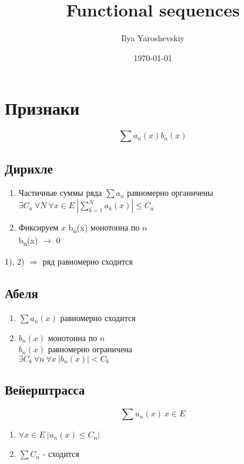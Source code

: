 \documentclass{article}
\author{Ilya Yaroshevskiy}
\date{\today}
\title{Functional sequences}
\begin{document}
\maketitle
\tableofcontents


\section{Признаки}
\label{sec:org1196bac}
\[ \sum a_n(x)b_n(x) \]
\subsection{Дирихле}
\label{sec:org4d3ddae}
\begin{enumerate}
\item Частичные суммы ряда \(\sum a_n\) равномерно органичены \\
\(\exists C_a\ \forall N\ \forall x \in E\ |\sum_{k=1}^{N}a_k(x)| \le C_a\)
\item Фиксируем \(x\) b\textsubscript{n}(x) монотонна по \(n\) \\
b\textsubscript{n}(x) \(\rightarrow\) 0
\end{enumerate}
1), 2) \(\Rightarrow\) ряд равномерно сходится

\subsection{Абеля}
\label{sec:orgad1fcd3}
\begin{enumerate}
\item \(\sum a_n(x)\) равномерно сходится
\item \(b_n(x)\) монотонна по \(n\) \\
\(b_n(x)\) равномерно ограничена \\
\(\exists C_b\ \forall n\ \forall x\ |b_n(x)| < C_b\)
\end{enumerate}
\subsection{Вейерштрасса}
\label{sec:org425bd88}
\[ \sum u_n(x)\ x \in E \]
\begin{enumerate}
\item \(\forall x \in E\ |u_n(x)\le C_n|\)
\item \(\sum C_n\) - сходится
\end{enumerate}
\end{document}
